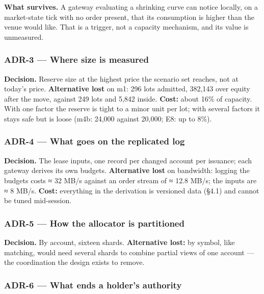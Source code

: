 \documentclass[10pt,a4paper]{article}
\begin{document}
\textbf{What survives.} A gateway evaluating a shrinking curve can notice locally, on
a market-state tick with no order present, that its consumption is higher than
the venue would like. That is a trigger, not a capacity mechanism, and its value
is unmeasured.

\subsubsection{ADR-3 --- Where size is measured}\label{adr-3-where-size-is-measured}

\textbf{Decision.} Reserve size at the highest price the scenario set reaches, not at
today's price. \textbf{Alternative lost} on m1: 296 lots admitted, 382,143 over equity
after the move, against 249 lots and 5,842 inside. \textbf{Cost:} about 16\% of
capacity. With one factor the reserve is tight to a minor unit per lot; with
several factors it stays safe but is loose (m4b: 24,000 against 20,000; E8: up to
8\%).

\subsubsection{ADR-4 --- What goes on the replicated log}\label{adr-4-what-goes-on-the-replicated-log}

\textbf{Decision.} The lease inputs, one record per changed account per issuance; each
gateway derives its own budgets. \textbf{Alternative lost} on bandwidth: logging the
budgets costs ≈ 32 MB/s against an order stream of ≈ 12.8 MB/s; the inputs are ≈
8 MB/s. \textbf{Cost:} everything in the derivation is versioned data (§4.1) and
cannot be tuned mid-session.

\subsubsection{ADR-5 --- How the allocator is partitioned}\label{adr-5-how-the-allocator-is-partitioned}

\textbf{Decision.} By account, sixteen shards. \textbf{Alternative lost:} by symbol, like
matching, would need several shards to combine partial views of one account ---
the coordination the design exists to remove.

\subsubsection{ADR-6 --- What ends a holder's authority}\label{adr-6-what-ends-a-holders-authority}
\end{document}
